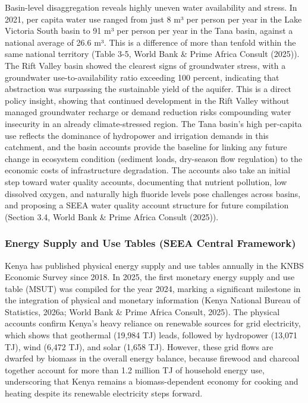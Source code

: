 \documentclass[
  letterpaper,
  DIV=11,
  numbers=noendperiod]{scrartcl}
\begin{document}
Basin-level disaggregation reveals highly uneven water availability and
stress. In 2021, per capita water use ranged from just 8 m³ per person
per year in the Lake Victoria South basin to 91 m³ per person per year
in the Tana basin, against a national average of 26.6 m³. This is a
difference of more than tenfold within the same national territory
(Table 3-5, World Bank \& Prime Africa Consult (2025)). The Rift Valley
basin showed the clearest signs of groundwater stress, with a
groundwater use-to-availability ratio exceeding 100 percent, indicating
that abstraction was surpassing the sustainable yield of the aquifer.
This is a direct policy insight, showing that continued development in
the Rift Valley without managed groundwater recharge or demand reduction
risks compounding water insecurity in an already climate-stressed
region. The Tana basin's high per-capita use reflects the dominance of
hydropower and irrigation demands in this catchment, and the basin
accounts provide the baseline for linking any future change in ecosystem
condition (sediment loads, dry-season flow regulation) to the economic
costs of infrastructure degradation. The accounts also take an initial
step toward water quality accounts, documenting that nutrient pollution,
low dissolved oxygen, and naturally high fluoride levels pose challenges
across basins, and proposing a SEEA water quality account structure for
future compilation (Section 3.4, World Bank \& Prime Africa Consult
(2025)).

\subsubsection{Energy Supply and Use Tables (SEEA Central
Framework)}\label{energy-supply-and-use-tables-seea-central-framework}

Kenya has published physical energy supply and use tables annually in
the KNBS Economic Survey since 2018. In 2025, the first monetary energy
supply and use table (MSUT) was compiled for the year 2024, marking a
significant milestone in the integration of physical and monetary
information (Kenya National Bureau of Statistics, 2026a; World Bank \&
Prime Africa Consult, 2025). The physical accounts confirm Kenya's heavy
reliance on renewable sources for grid electricity, which shows that
geothermal (19,984 TJ) leads, followed by hydropower (13,071 TJ), wind
(6,472 TJ), and solar (1,658 TJ). However, these grid flows are dwarfed
by biomass in the overall energy balance, because firewood and charcoal
together account for more than 1.2 million TJ of household energy use,
underscoring that Kenya remains a biomass-dependent economy for cooking
and heating despite its renewable electricity steps forward.
\end{document}
